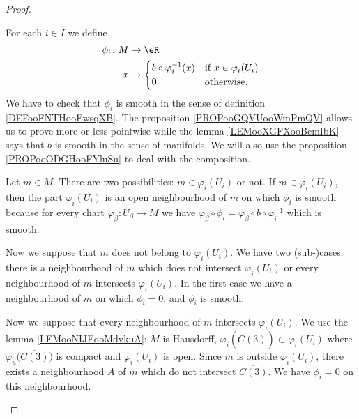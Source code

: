 \begin{proof}
\begin{subproof}
		For each \( i\in I \) we define
		\begin{equation}
			\begin{aligned}
				\phi_i\colon M & \to \eR                                                           \\
				x              & \mapsto \begin{cases}
					                         b\circ \varphi_i^{-1}(x) & \text{if } x\in \varphi_i(U_i) \\
					                         0                        & \text{otherwise. }
				                         \end{cases}
			\end{aligned}
		\end{equation}
		We have to check that \( \phi_i\) is smooth in the sense of definition \ref{DEFooFNTHooEwsqXB}. The proposition \ref{PROPooGQVUooWmPmQV} allows us to prove more or less pointwise while the lemma \ref{LEMooXGFXooBcmIbK} says that \( b\) is smooth in the sense of manifolds. We will also use the proposition \ref{PROPooODGHooFYluSu} to deal with the composition.

		Let \( m\in M\). There are two possibilities: \( m\in \varphi_i(U_i)\) or not. If \( m\in \varphi_i(U_i)\), then the part \( \varphi_i(U_i)\) is an open neighbourhood of \( m\) on which \( \phi_i\) is smooth because for every chart \(\varphi_{\beta} \colon U_{\beta}\to M  \) we have \( \varphi_{\beta}\circ \phi_i=\varphi_{\beta}\circ b\circ \varphi_i^{-1}\) which is smooth.

		Now we suppose that \( m\) does not belong to \( \varphi_i(U_i)\). We have two (sub-)cases: there is a neighbourhood of \( m\) which does not intersect \( \varphi_i(U_i)\) or every neighbourhood of \( m\) intersects \( \varphi_i(U_i)\). In the first case we have a neighbourhood of \( m\) on which \( \phi_i=0\), and \( \phi_i\) is smooth.

		Now we suppose that every neighbourhood of \( m\) intersects \( \varphi_i(U_i)\). We use the lemma \ref{LEMooNIJEooMdvkuA}: \( M\) is Hausdorff, \(  \varphi_i(\overline{C(3)})\subset\varphi_i(U_i)  \) where \( \varphi_u\big( \overline{C(3)} \big)\) is compact and \( \varphi_i(U_i)\) is open. Since \( m\) is outside \( \varphi_i(U_i)\), there exists a neighbourhood \( A\) of \( m\) which do not intersect \( \overline{C(3)}\). We have \( \phi_i=0\) on this neighbourhood.
	\end{subproof}
\end{proof}



